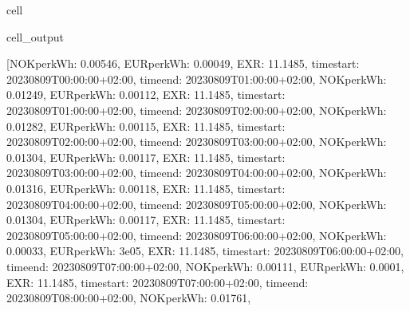 \documentclass[letterpaper,10pt,english]{jupyterBook}
\begin{document}
\begin{sphinxuseclass}{cell}
\begin{sphinxVerbatimOutput}
\begin{sphinxuseclass}{cell_output}
\begin{sphinxVerbatim}[commandchars=\\\{\}]
[\PYGZob{}\PYGZsq{}NOK\PYGZus{}per\PYGZus{}kWh\PYGZsq{}: 0.00546, \PYGZsq{}EUR\PYGZus{}per\PYGZus{}kWh\PYGZsq{}: 0.00049, \PYGZsq{}EXR\PYGZsq{}: 11.1485, \PYGZsq{}time\PYGZus{}start\PYGZsq{}: \PYGZsq{}2023\PYGZhy{}08\PYGZhy{}09T00:00:00+02:00\PYGZsq{}, \PYGZsq{}time\PYGZus{}end\PYGZsq{}: \PYGZsq{}2023\PYGZhy{}08\PYGZhy{}09T01:00:00+02:00\PYGZsq{}\PYGZcb{}, \PYGZob{}\PYGZsq{}NOK\PYGZus{}per\PYGZus{}kWh\PYGZsq{}: \PYGZhy{}0.01249, \PYGZsq{}EUR\PYGZus{}per\PYGZus{}kWh\PYGZsq{}: \PYGZhy{}0.00112, \PYGZsq{}EXR\PYGZsq{}: 11.1485, \PYGZsq{}time\PYGZus{}start\PYGZsq{}: \PYGZsq{}2023\PYGZhy{}08\PYGZhy{}09T01:00:00+02:00\PYGZsq{}, \PYGZsq{}time\PYGZus{}end\PYGZsq{}: \PYGZsq{}2023\PYGZhy{}08\PYGZhy{}09T02:00:00+02:00\PYGZsq{}\PYGZcb{}, \PYGZob{}\PYGZsq{}NOK\PYGZus{}per\PYGZus{}kWh\PYGZsq{}: \PYGZhy{}0.01282, \PYGZsq{}EUR\PYGZus{}per\PYGZus{}kWh\PYGZsq{}: \PYGZhy{}0.00115, \PYGZsq{}EXR\PYGZsq{}: 11.1485, \PYGZsq{}time\PYGZus{}start\PYGZsq{}: \PYGZsq{}2023\PYGZhy{}08\PYGZhy{}09T02:00:00+02:00\PYGZsq{}, \PYGZsq{}time\PYGZus{}end\PYGZsq{}: \PYGZsq{}2023\PYGZhy{}08\PYGZhy{}09T03:00:00+02:00\PYGZsq{}\PYGZcb{}, \PYGZob{}\PYGZsq{}NOK\PYGZus{}per\PYGZus{}kWh\PYGZsq{}: \PYGZhy{}0.01304, \PYGZsq{}EUR\PYGZus{}per\PYGZus{}kWh\PYGZsq{}: \PYGZhy{}0.00117, \PYGZsq{}EXR\PYGZsq{}: 11.1485, \PYGZsq{}time\PYGZus{}start\PYGZsq{}: \PYGZsq{}2023\PYGZhy{}08\PYGZhy{}09T03:00:00+02:00\PYGZsq{}, \PYGZsq{}time\PYGZus{}end\PYGZsq{}: \PYGZsq{}2023\PYGZhy{}08\PYGZhy{}09T04:00:00+02:00\PYGZsq{}\PYGZcb{}, \PYGZob{}\PYGZsq{}NOK\PYGZus{}per\PYGZus{}kWh\PYGZsq{}: \PYGZhy{}0.01316, \PYGZsq{}EUR\PYGZus{}per\PYGZus{}kWh\PYGZsq{}: \PYGZhy{}0.00118, \PYGZsq{}EXR\PYGZsq{}: 11.1485, \PYGZsq{}time\PYGZus{}start\PYGZsq{}: \PYGZsq{}2023\PYGZhy{}08\PYGZhy{}09T04:00:00+02:00\PYGZsq{}, \PYGZsq{}time\PYGZus{}end\PYGZsq{}: \PYGZsq{}2023\PYGZhy{}08\PYGZhy{}09T05:00:00+02:00\PYGZsq{}\PYGZcb{}, \PYGZob{}\PYGZsq{}NOK\PYGZus{}per\PYGZus{}kWh\PYGZsq{}: \PYGZhy{}0.01304, \PYGZsq{}EUR\PYGZus{}per\PYGZus{}kWh\PYGZsq{}: \PYGZhy{}0.00117, \PYGZsq{}EXR\PYGZsq{}: 11.1485, \PYGZsq{}time\PYGZus{}start\PYGZsq{}: \PYGZsq{}2023\PYGZhy{}08\PYGZhy{}09T05:00:00+02:00\PYGZsq{}, \PYGZsq{}time\PYGZus{}end\PYGZsq{}: \PYGZsq{}2023\PYGZhy{}08\PYGZhy{}09T06:00:00+02:00\PYGZsq{}\PYGZcb{}, \PYGZob{}\PYGZsq{}NOK\PYGZus{}per\PYGZus{}kWh\PYGZsq{}: \PYGZhy{}0.00033, \PYGZsq{}EUR\PYGZus{}per\PYGZus{}kWh\PYGZsq{}: \PYGZhy{}3e\PYGZhy{}05, \PYGZsq{}EXR\PYGZsq{}: 11.1485, \PYGZsq{}time\PYGZus{}start\PYGZsq{}: \PYGZsq{}2023\PYGZhy{}08\PYGZhy{}09T06:00:00+02:00\PYGZsq{}, \PYGZsq{}time\PYGZus{}end\PYGZsq{}: \PYGZsq{}2023\PYGZhy{}08\PYGZhy{}09T07:00:00+02:00\PYGZsq{}\PYGZcb{}, \PYGZob{}\PYGZsq{}NOK\PYGZus{}per\PYGZus{}kWh\PYGZsq{}: 0.00111, \PYGZsq{}EUR\PYGZus{}per\PYGZus{}kWh\PYGZsq{}: 0.0001, \PYGZsq{}EXR\PYGZsq{}: 11.1485, \PYGZsq{}time\PYGZus{}start\PYGZsq{}: \PYGZsq{}2023\PYGZhy{}08\PYGZhy{}09T07:00:00+02:00\PYGZsq{}, \PYGZsq{}time\PYGZus{}end\PYGZsq{}: \PYGZsq{}2023\PYGZhy{}08\PYGZhy{}09T08:00:00+02:00\PYGZsq{}\PYGZcb{}, \PYGZob{}\PYGZsq{}NOK\PYGZus{}per\PYGZus{}kWh\PYGZsq{}: 0.01761, 
\end{sphinxVerbatim}
\end{sphinxuseclass}
\end{sphinxVerbatimOutput}
\end{sphinxuseclass}
\end{document}
